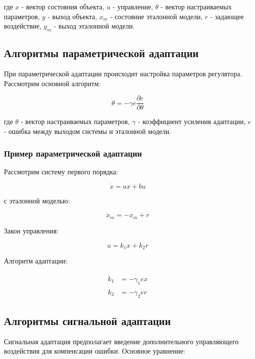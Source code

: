 \documentclass[a4paper,14pt]{extarticle} %
\begin{document}
где $x$ - вектор состояния объекта, $u$ - управление, $\theta$ - вектор настраиваемых параметров, $y$ - выход объекта, $x_m$ - состояние эталонной модели, $r$ - задающее воздействие, $y_m$ - выход эталонной модели.

\subsection{Алгоритмы параметрической адаптации}
При параметрической адаптации происходит настройка параметров регулятора. Рассмотрим основной алгоритм:

\begin{equation}
\dot{\theta} = -\gamma e \frac{\partial e}{\partial \theta}
\end{equation}

где $\theta$ - вектор настраиваемых параметров, $\gamma$ - коэффициент усиления адаптации, $e$ - ошибка между выходом системы и эталонной модели.

\subsubsection{Пример параметрической адаптации}
Рассмотрим систему первого порядка:

\begin{equation}
\dot{x} = ax + bu
\end{equation}

с эталонной моделью:

\begin{equation}
\dot{x}_m = -x_m + r
\end{equation}

Закон управления:

\begin{equation}
u = k_1 x + k_2 r
\end{equation}

Алгоритм адаптации:

\begin{equation}
\begin{aligned}
\dot{k}_1 &= -\gamma_1 e x \\
\dot{k}_2 &= -\gamma_2 e r
\end{aligned}
\end{equation}

\subsection{Алгоритмы сигнальной адаптации}
Сигнальная адаптация предполагает введение дополнительного управляющего воздействия для компенсации ошибки. Основное уравнение:
\end{document}
